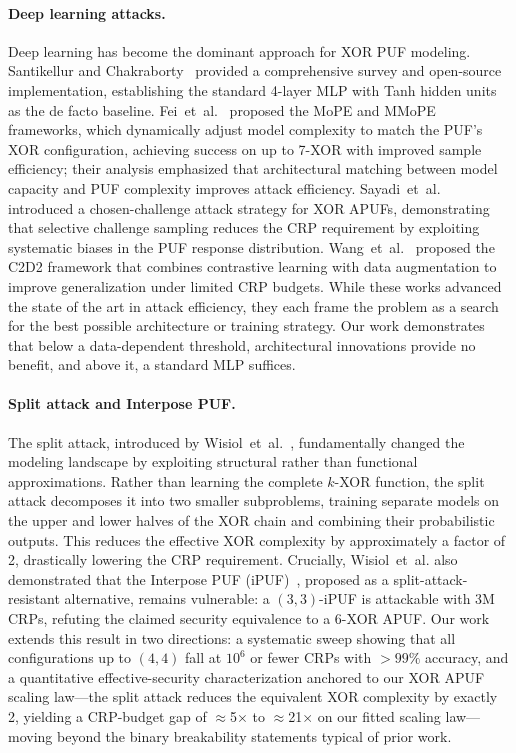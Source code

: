 \paragraph{Deep learning attacks.}
Deep learning has become the dominant approach for XOR PUF modeling.
Santikellur and Chakraborty~\cite{santikellur2023} provided a comprehensive
survey and open-source implementation, establishing the standard 4-layer MLP
with Tanh hidden units as the de facto baseline.  Fei~et~al.~\cite{fei2024mope}
proposed the MoPE and MMoPE frameworks, which dynamically adjust model
complexity to match the PUF's XOR configuration, achieving success on up to
7-XOR with improved sample efficiency; their analysis emphasized that
architectural matching between model capacity and PUF complexity improves attack
efficiency.  Sayadi~et~al.~\cite{sayadi2025} introduced a chosen-challenge
attack strategy for XOR APUFs, demonstrating that selective challenge sampling
reduces the CRP requirement by exploiting systematic biases in the PUF response
distribution.  Wang~et~al.~\cite{wang2024c2d2} proposed the C2D2 framework
that combines contrastive learning with data augmentation to improve
generalization under limited CRP budgets.  While these works advanced the
state of the art in attack efficiency, they each frame the problem as a search
for the best possible architecture or training strategy.  Our work demonstrates
that below a data-dependent threshold, architectural innovations provide no
benefit, and above it, a standard MLP suffices.

\paragraph{Split attack and Interpose PUF.}
The split attack, introduced by Wisiol~et~al.~\cite{wisiol2020splitting}, fundamentally changed the modeling landscape by exploiting
structural rather than functional approximations.  Rather than learning the
complete $k$-XOR function, the split attack decomposes it into two smaller
subproblems, training separate models on the upper and lower halves of the XOR
chain and combining their probabilistic outputs.  This reduces the effective
XOR complexity by approximately a factor of 2, drastically lowering the CRP
requirement.  Crucially, Wisiol~et~al. also demonstrated that the Interpose PUF
(iPUF)~\cite{nguyen2019}, proposed as a split-attack-resistant alternative,
remains vulnerable: a $(3,3)$-iPUF is attackable with 3M CRPs, refuting the
claimed security equivalence to a 6-XOR APUF.  Our work extends this result in
two directions: a systematic sweep showing that all configurations up to
$(4,4)$ fall at $10^6$ or fewer CRPs with $>99\%$ accuracy, and a quantitative
effective-security characterization anchored to our XOR APUF scaling law---the
split attack reduces the equivalent XOR complexity by exactly 2, yielding a
CRP-budget gap of $\approx$5$\times$ to $\approx$21$\times$ on our fitted
scaling law---moving beyond the binary breakability statements typical of
prior work.

